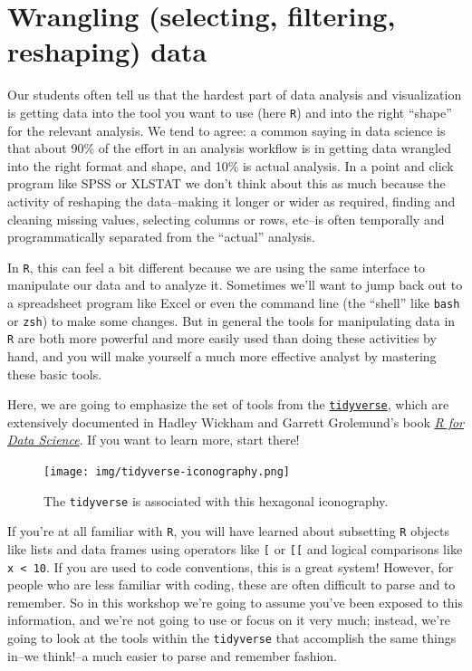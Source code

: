 \documentclass[
]{book}
\begin{document}
\hypertarget{wrangling-selecting-filtering-reshaping-data}{%
\section{Wrangling (selecting, filtering, reshaping) data}\label{wrangling-selecting-filtering-reshaping-data}}

Our students often tell us that the hardest part of data analysis and visualization is getting data into the tool you want to use (here \texttt{R}) and into the right ``shape'' for the relevant analysis. We tend to agree: a common saying in data science is that about 90\% of the effort in an analysis workflow is in getting data wrangled into the right format and shape, and 10\% is actual analysis. In a point and click program like SPSS or XLSTAT we don't think about this as much because the activity of reshaping the data--making it longer or wider as required, finding and cleaning missing values, selecting columns or rows, etc--is often temporally and programmatically separated from the ``actual'' analysis.

In \texttt{R}, this can feel a bit different because we are using the same interface to manipulate our data and to analyze it. Sometimes we'll want to jump back out to a spreadsheet program like Excel or even the command line (the ``shell'' like \texttt{bash} or \texttt{zsh}) to make some changes. But in general the tools for manipulating data in \texttt{R} are both more powerful and more easily used than doing these activities by hand, and you will make yourself a much more effective analyst by mastering these basic tools.

Here, we are going to emphasize the set of tools from the \href{https://www.tidyverse.org/}{\texttt{tidyverse}}, which are extensively documented in Hadley Wickham and Garrett Grolemund's book \href{https://r4ds.had.co.nz/}{\emph{R for Data Science}}. If you want to learn more, start there!

\begin{figure}
\centering
\texttt{[image: img/tidyverse-iconography.png]}
\caption{The \texttt{tidyverse} is associated with this hexagonal iconography.}
\end{figure}

If you're at all familiar with \texttt{R}, you will have learned about subsetting \texttt{R} objects like lists and data frames using operators like \texttt{{[}} or \texttt{{[}{[}} and logical comparisons like \texttt{x\ \textless{}\ 10}. If you are used to code conventions, this is a great system! However, for people who are less familiar with coding, these are often difficult to parse and to remember. So in this workshop we're going to assume you've been exposed to this information, and we're not going to use or focus on it very much; instead, we're going to look at the tools within the \texttt{tidyverse} that accomplish the same things in--we think!--a much easier to parse and remember fashion.
\end{document}
